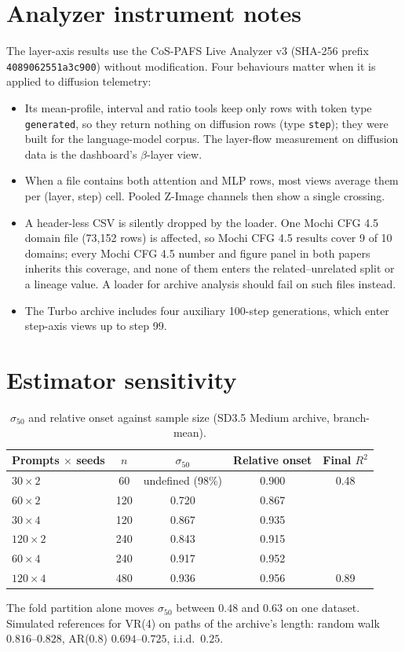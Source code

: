 \section{Analyzer instrument notes}\label{app:analyzer}
The layer-axis results use the CoS-PAFS Live Analyzer v3 (SHA-256 prefix \texttt{4089062551a3c900}) without modification. Four behaviours matter when it is applied to diffusion telemetry:
\begin{itemize}
 \item Its mean-profile, interval and ratio tools keep only rows with token type \texttt{generated}, so they return nothing on diffusion rows (type \texttt{step}); they were built for the language-model corpus. The layer-flow measurement on diffusion data is the dashboard's $\beta$-layer view.
 \item When a file contains both attention and MLP rows, most views average them per (layer, step) cell. Pooled Z-Image channels then show a single crossing.
 \item A header-less CSV is silently dropped by the loader. One Mochi CFG 4.5 domain file (73{,}152 rows) is affected, so Mochi CFG 4.5 results cover 9 of 10 domains; every Mochi CFG 4.5 number and figure panel in both papers inherits this coverage, and none of them enters the related--unrelated split or a lineage value. A loader for archive analysis should fail on such files instead.
 \item The Turbo archive includes four auxiliary 100-step generations, which enter step-axis views up to step 99.
\end{itemize}

\section{Estimator sensitivity}\label{app:estimators}
\begin{table}[htbp]
\centering\small
\caption{$\sigma_{50}$ and relative onset against sample size (SD3.5 Medium archive, branch-mean).}
\begin{tabular}{lcccc}
\toprule
Prompts $\times$ seeds & $n$ & $\sigma_{50}$ & Relative onset & Final $R^2$\\
\midrule
$30\times2$ & 60 & undefined (98\%) & 0.900 & 0.48\\
$60\times2$ & 120 & 0.720 & 0.867 & \\
$30\times4$ & 120 & 0.867 & 0.935 & \\
$120\times2$ & 240 & 0.843 & 0.915 & \\
$60\times4$ & 240 & 0.917 & 0.952 & \\
$120\times4$ & 480 & 0.936 & 0.956 & 0.89\\
\bottomrule
\end{tabular}
\end{table}
The fold partition alone moves $\sigma_{50}$ between $0.48$ and $0.63$ on one dataset. Simulated references for VR(4) on paths of the archive's length: random walk $0.816$--$0.828$, AR(0.8) $0.694$--$0.725$, i.i.d.\ $0.25$.

